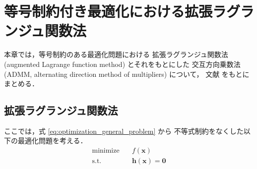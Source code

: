%

\chapter{等号制約付き最適化における拡張ラグランジュ関数法}\label{chap:opt_augmented-lagrange-function-for-equality-constraints}

本章では，等号制約のある最適化問題における
拡張ラグランジュ関数法 (augmented Lagrange function method)
とそれをもとにした
交互方向乗数法 (ADMM, alternating direction method of multipliers)
について，
文献 \cite{Ito2008, Boyd2010, Hisano2012} をもとにまとめる．

\section{拡張ラグランジュ関数法}

ここでは，式 \eqref{eq:optimization_general_problem} から
不等式制約をなくした以下の最適化問題を考える．
\begin{equation}
    \begin{aligned}
        \text{minimize} \hspace{1em} & f(\bm{x})               \\
        \text{s.t.} \hspace{1em}     & \bm{h}(\bm{x}) = \bm{0}
    \end{aligned}
    \label{eq:optimization_equality-constraind-problem}
\end{equation}

